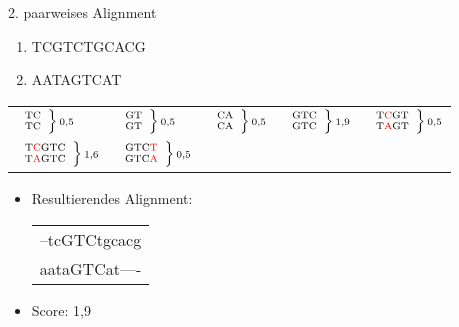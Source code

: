 \documentclass[wide,xcolor={x11names},hyperref={colorlinks=false},pantone312]{beamer}
\begin{document}
\begin{frame}[t]{2. paarweises Alignment}
	\small
	\ttfamily
	\begin{enumerate}
		\item TCGTCTGCACG
		\item AATAGTCAT
		\normalfont
	\end{enumerate}
	\begin{tabular*}{12cm}{lllll}
		\rule{0pt}{4ex}
		$ \scriptsize \left. \begin{array}{c} \mbox{TC}\\\mbox{TC} \end{array} \right \} \mbox{0,5}$ & $ \scriptsize \left. \begin{array}{c} \mbox{GT}\\\mbox{GT} \end{array} \right \} \mbox{0,5}$ &
		$ \scriptsize \left. \begin{array}{c} \mbox{CA}\\\mbox{CA} \end{array} \right \} \mbox{0,5}$ & $ \scriptsize \left. \begin{array}{c} \mbox{GTC}\\\mbox{GTC} \end{array} \right \} \mbox{1,9}$ &
		$ \scriptsize \left. \begin{array}{c} \mbox{T\textcolor{red}{C}GT}\\\mbox{T\textcolor{red}{A}GT} \end{array} \right \} \mbox{0,5}$ \\
		\rule{0pt}{4ex}
		$ \scriptsize \left. \begin{array}{c} \mbox{T\textcolor{red}{C}GTC}\\\mbox{T\textcolor{red}{A}GTC} \end{array} \right \} \mbox{1,6}$ & $ \scriptsize \left. \begin{array}{c} \mbox{GTC\textcolor{red}{T}}\\\mbox{GTC\textcolor{red}{A}} \end{array} \right \} \mbox{0,5}$ & 
	\end{tabular*} \pause
	\begin{itemize}
		\item Resultierendes Alignment: \\
		\ttfamily
		\begin{tabular}{l}
			--tcGTCtgcacg \\
			aataGTCat----
		\end{tabular}
		\normalfont
		\item Score: 1,9
	\end{itemize}
	\normalfont
	\normalsize	
\end{frame}
\end{document}
